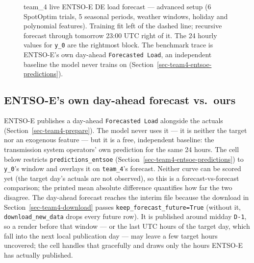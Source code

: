 \documentclass[
  english,
  letterpaper,
]{scrbook}
\begin{document}
\begin{figure}


\caption{\label{fig-team4-predict}team\_4 live ENTSO-E DE load forecast
--- advanced setup (6 SpotOptim trials, 5 seasonal periods, weather
windows, holiday and polynomial features). Training fit left of the
dashed line; recursive forecast through tomorrow 23:00 UTC right of it.
The 24 hourly values for \texttt{y\_0} are the rightmost block. The
benchmark trace is ENTSO-E's own day-ahead \texttt{Forecasted\ Load}, an
independent baseline the model never trains on
(Section~\ref{sec-team4-entsoe-predictions}).}

\end{figure}%

\subsection{ENTSO-E's own day-ahead forecast
vs.~ours}\label{sec-team4-vs-entsoe}

ENTSO-E publishes a day-ahead \texttt{Forecasted\ Load} alongside the
actuals (Section~\ref{sec-team4-prepare}). The model never uses it ---
it is neither the target nor an exogenous feature --- but it is a free,
independent baseline: the transmission system operators' own prediction
for the same 24 hours. The cell below restricts
\texttt{predictions\_entsoe}
(Section~\ref{sec-team4-entsoe-predictions}) to \texttt{y\_0}'s window
and overlays it on \texttt{team\_4}'s forecast. Neither curve can be
scored yet (the target day's actuals are not observed), so this is a
forecast-vs-forecast comparison; the printed mean absolute difference
quantifies how far the two disagree. The day-ahead forecast reaches the
interim file because the download in Section~\ref{sec-team4-download}
passes \texttt{keep\_forecast\_future=True} (without it,
\texttt{download\_new\_data} drops every future row). It is published
around midday \texttt{D-1}, so a render before that window --- or the
last UTC hours of the target day, which fall into the next local
publication day --- may leave a few target hours uncovered; the cell
handles that gracefully and draws only the hours ENTSO-E has actually
published.
\end{document}
